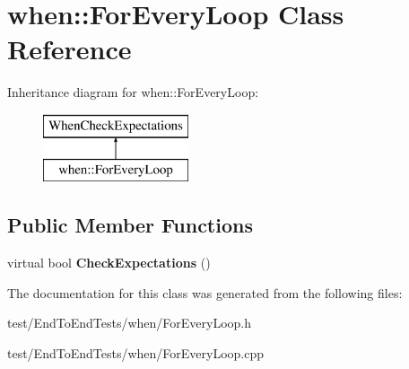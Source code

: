 \hypertarget{classwhen_1_1ForEveryLoop}{}\section{when\+:\+:For\+Every\+Loop Class Reference}
\label{classwhen_1_1ForEveryLoop}
Inheritance diagram for when\+:\+:For\+Every\+Loop\+:\begin{figure}[H]
\begin{center}
\leavevmode
\includegraphics[height=2.000000cm]{classwhen_1_1ForEveryLoop}
\end{center}
\end{figure}
\subsection*{Public Member Functions}
\begin{DoxyCompactItemize}
\item 
virtual bool {\bfseries Check\+Expectations} ()\hypertarget{classwhen_1_1ForEveryLoop_ad982837a130de5d128974f8a8a421205}{}\label{classwhen_1_1ForEveryLoop_ad982837a130de5d128974f8a8a421205}

\end{DoxyCompactItemize}


The documentation for this class was generated from the following files\+:\begin{DoxyCompactItemize}
\item 
test/\+End\+To\+End\+Tests/when/For\+Every\+Loop.\+h\item 
test/\+End\+To\+End\+Tests/when/For\+Every\+Loop.\+cpp\end{DoxyCompactItemize}
